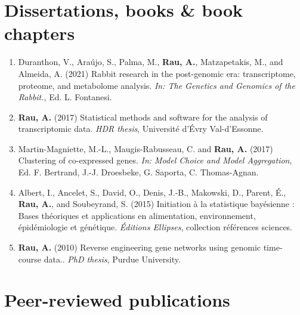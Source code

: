 \documentclass[11pt, a4paper]{awesome-cv}
\providecommand{\tightlist}{%
	\setlength{\itemsep}{0pt}\setlength{\parskip}{0pt}}
\begin{document}
\begin{cvhonors}
\end{cvhonors}

\hypertarget{dissertations-books-book-chapters}{%
\section{Dissertations, books \& book
chapters}\label{dissertations-books-book-chapters}}

\begin{enumerate}
\def\labelenumi{\arabic{enumi}.}
\tightlist
\item
  Duranthon, V., Araújo, S., Palma, M., \textbf{Rau, A.}, Matzapetakis,
  M., and Almeida, A. (2021) Rabbit research in the post-genomic era:
  transcriptome, proteome, and metabolome analysis. \emph{In: The
  Genetics and Genomics of the Rabbit.}, Ed. L. Fontanesi.
\item
  \textbf{Rau, A.} (2017) Statistical methods and software for the
  analysis of transcriptomic data. \emph{HDR thesis}, Université d'Évry
  Val-d'Essonne.
\item
  Martin-Magniette, M.-L., Maugis-Rabusseau, C. and \textbf{Rau, A.}
  (2017) Clustering of co-expressed genes. \emph{In: Model Choice and
  Model Aggregation}, Ed. F. Bertrand, J.-J. Droesbeke, G. Saporta, C.
  Thomas-Agnan.
\item
  Albert, I., Ancelet, S., David, O., Denis, J.-B., Makowski, D.,
  Parent, É., \textbf{Rau, A.}, and Soubeyrand, S. (2015) Initiation à
  la statistique bayésienne : Bases théoriques et applications en
  alimentation, environnement, épidémiologie et génétique.
  \emph{Éditions Ellipses}, collection références sciences.
\item
  \textbf{Rau, A.} (2010) Reverse engineering gene networks using
  genomic time-course data.. \emph{PhD thesis}, Purdue University.
\end{enumerate}

\hypertarget{peer-reviewed-publications}{%
\section{Peer-reviewed publications}\label{peer-reviewed-publications}}
\end{document}
